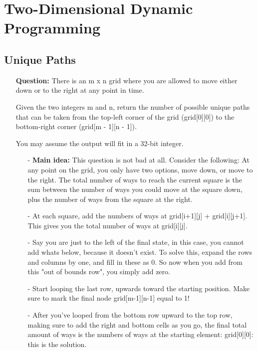 \documentclass[12pt]{article}
\begin{document}
\section{Two-Dimensional Dynamic Programming}
\subsection{Unique Paths}
\begin{enumerate}
  \item[] \textbf{Question:}
    There is an m x n grid where you are allowed to move either down or to the right at any point in time.

Given the two integers m and n, return the number of possible unique paths that can be taken from the top-left corner of the grid (grid[0][0]) to the bottom-right corner (grid[m - 1][n - 1]).

You may assume the output will fit in a 32-bit integer.

    \begin{enumerate}
      \item[-] \textbf{Main idea:} This question is not bad at all. Consider the following: At any point on the grid, you only have two options, move down, or move to the right. The total number of ways to reach the current square is the sum between the number of ways you could move at the square down, plus the number of ways from the square at the right.
      \item[-] At each square, add the numbers of ways at grid[i+1][j] + grid[i][j+1]. This gives you the total number of ways at grid[i][j].
      \item[-] Say you are just to the left of the final state, in this case, you cannot add whats below, because it doesn't exist. To solve this, expand the rows and columns by one, and fill in these as 0. So now when you add from this "out of bounds row", you simply add zero. 
      \item[-] Start looping the last row, upwards toward the starting position. Make sure to mark the final node grid[m-1][n-1] equal to 1!
      \item[-] After you've looped from the bottom row upward to the top row, making sure to add the right and bottom cells as you go, the final total amount of ways is the numbers of ways at the starting element: grid[0][0]: this is the solution.
    \end{enumerate}
\end{enumerate}
\end{document}
